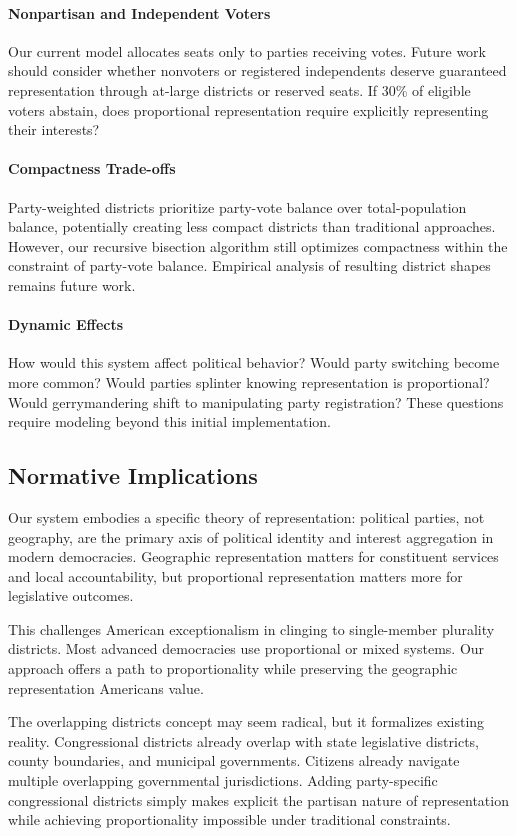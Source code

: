 \paragraph{Nonpartisan and Independent Voters}
Our current model allocates seats only to parties receiving votes. Future work should consider whether nonvoters or registered independents deserve guaranteed representation through at-large districts or reserved seats. If 30\% of eligible voters abstain, does proportional representation require explicitly representing their interests?

\paragraph{Compactness Trade-offs}
Party-weighted districts prioritize party-vote balance over total-population balance, potentially creating less compact districts than traditional approaches. However, our recursive bisection algorithm still optimizes compactness within the constraint of party-vote balance. Empirical analysis of resulting district shapes remains future work.

\paragraph{Dynamic Effects}
How would this system affect political behavior? Would party switching become more common? Would parties splinter knowing representation is proportional? Would gerrymandering shift to manipulating party registration? These questions require modeling beyond this initial implementation.

\subsection{Normative Implications}

Our system embodies a specific theory of representation: political parties, not geography, are the primary axis of political identity and interest aggregation in modern democracies. Geographic representation matters for constituent services and local accountability, but proportional representation matters more for legislative outcomes.

This challenges American exceptionalism in clinging to single-member plurality districts. Most advanced democracies use proportional or mixed systems. Our approach offers a path to proportionality while preserving the geographic representation Americans value.

The overlapping districts concept may seem radical, but it formalizes existing reality. Congressional districts already overlap with state legislative districts, county boundaries, and municipal governments. Citizens already navigate multiple overlapping governmental jurisdictions. Adding party-specific congressional districts simply makes explicit the partisan nature of representation while achieving proportionality impossible under traditional constraints.
